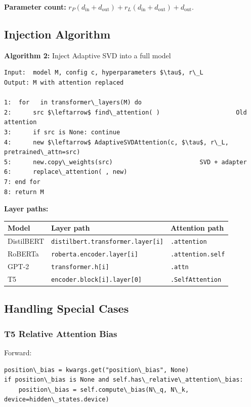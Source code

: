 \textbf{Parameter count:} $r_P(d_\text{in} + d_\text{out}) + r_L(d_\text{in} + d_\text{out}) + d_\text{out}$.

\subsection{Injection Algorithm}

\textbf{Algorithm 2:} Inject Adaptive SVD into a full model
\begin{lstlisting}
Input:  model M, config c, hyperparameters $\tau$, r\_L
Output: M with attention replaced

1:  for   in transformer\_layers(M) do
2:      src $\leftarrow$ find\_attention( )                     Old attention
3:      if src is None: continue
4:      new $\leftarrow$ AdaptiveSVDAttention(c, $\tau$, r\_L, pretrained\_attn=src)
5:      new.copy\_weights(src)                        SVD + adapter
6:      replace\_attention( , new)
7: end for
8: return M
\end{lstlisting}

\textbf{Layer paths:}

\begin{table}[H]
\centering
\small
\begin{tabular}{lll}
\toprule
\textbf{Model} & \textbf{Layer path} & \textbf{Attention path} \\
\midrule
DistilBERT & \texttt{distilbert.transformer.layer[i]} & \texttt{.attention} \\
RoBERTa & \texttt{roberta.encoder.layer[i]} & \texttt{.attention.self} \\
GPT-2 & \texttt{transformer.h[i]} & \texttt{.attn} \\
T5 & \texttt{encoder.block[i].layer[0]} & \texttt{.SelfAttention} \\
\bottomrule
\end{tabular}
\end{table}

\subsection{Handling Special Cases}

\subsubsection{T5 Relative Attention Bias}

Forward:

\begin{lstlisting}
position\_bias = kwargs.get("position\_bias", None)
if position\_bias is None and self.has\_relative\_attention\_bias:
    position\_bias = self.compute\_bias(N\_q, N\_k, device=hidden\_states.device)
\end{lstlisting}

